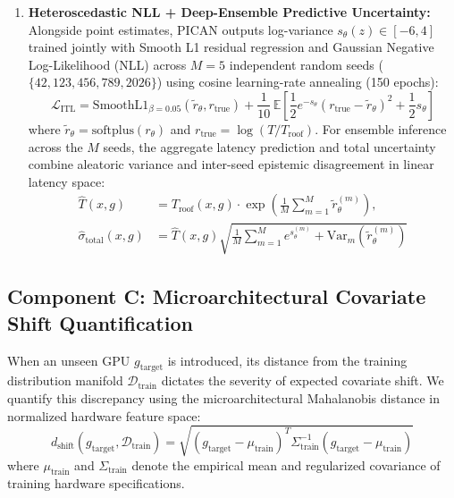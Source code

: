\documentclass[preprint,12pt]{elsarticle}
\begin{document}
\begin{enumerate}
    Similarly, for operational power draw, predictions are bounded within the physical TDP envelope:
    \begin{equation}
    \hat{P}(x, g) = TDP(g) \cdot \sigma\left(p_\theta(z)\right)
    \end{equation}
    where $\sigma(\cdot)$ denotes the sigmoid function, guaranteeing $\hat{P} \in (0, TDP(g))$.
    \item \textbf{Heteroscedastic NLL + Deep-Ensemble Predictive Uncertainty:} Alongside point estimates, PICAN outputs log-variance $s_\theta(z) \in [-6, 4]$ trained jointly with Smooth L1 residual regression and Gaussian Negative Log-Likelihood (NLL) across $M=5$ independent random seeds ($\{42, 123, 456, 789, 2026\}$) using cosine learning-rate annealing (150 epochs):
    \begin{equation}
    \mathcal{L}_{\text{ITL}} = \mathrm{SmoothL1}_{\beta=0.05}\!\left(\tilde{r}_\theta, r_{\text{true}}\right) + \frac{1}{10}\,\mathbb{E}\!\left[\frac{1}{2} e^{-s_\theta} (r_{\text{true}} - \tilde{r}_\theta)^2 + \frac{1}{2} s_\theta\right]
    \end{equation}
    where $\tilde{r}_\theta = \mathrm{softplus}(r_\theta)$ and $r_{\text{true}} = \log(T / T_{\text{roof}})$. For ensemble inference across the $M$ seeds, the aggregate latency prediction and total uncertainty combine aleatoric variance and inter-seed epistemic disagreement in linear latency space:
    \begin{align}
    \hat{T}(x, g) &= T_{\text{roof}}(x, g)\cdot \exp\!\left(\frac{1}{M}\sum_{m=1}^M \tilde{r}_\theta^{(m)}\right), \\
    \hat{\sigma}_{\text{total}}(x, g) &= \hat{T}(x, g)\sqrt{\frac{1}{M}\sum_{m=1}^M e^{s_\theta^{(m)}} + \mathrm{Var}_m\!\left(\tilde{r}_\theta^{(m)}\right)}
    \end{align}
\end{enumerate}

\subsection{Component C: Microarchitectural Covariate Shift Quantification}
When an unseen GPU $g_{\text{target}}$ is introduced, its distance from the training distribution manifold $\mathcal{D}_{\text{train}}$ dictates the severity of expected covariate shift. We quantify this discrepancy using the microarchitectural Mahalanobis distance in normalized hardware feature space:
\begin{equation}
\label{eq:mahalanobis}
d_{\text{shift}}(g_{\text{target}}, \mathcal{D}_{\text{train}}) = \sqrt{(g_{\text{target}} - \mu_{\text{train}})^T \Sigma_{\text{train}}^{-1} (g_{\text{target}} - \mu_{\text{train}})}
\end{equation}
where $\mu_{\text{train}}$ and $\Sigma_{\text{train}}$ denote the empirical mean and regularized covariance of training hardware specifications.
\end{document}
